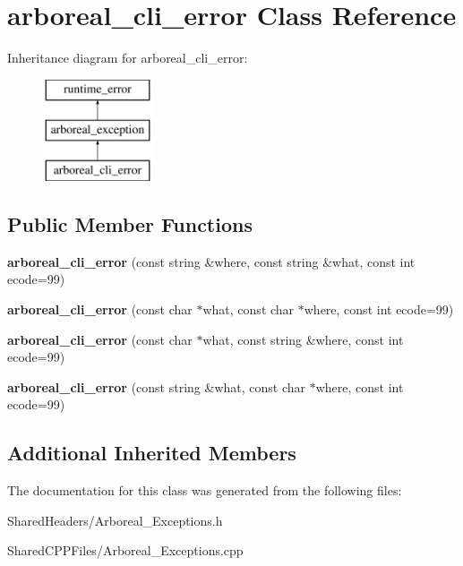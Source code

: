 \hypertarget{classarboreal__cli__error}{}\section{arboreal\+\_\+cli\+\_\+error Class Reference}
\label{classarboreal__cli__error}
Inheritance diagram for arboreal\+\_\+cli\+\_\+error\+:\begin{figure}[H]
\begin{center}
\leavevmode
\includegraphics[height=3.000000cm]{classarboreal__cli__error}
\end{center}
\end{figure}
\subsection*{Public Member Functions}
\begin{DoxyCompactItemize}
\item 
{\bfseries arboreal\+\_\+cli\+\_\+error} (const string \&where, const string \&what, const int ecode=99)\hypertarget{classarboreal__cli__error_a39291e6c997b531c712892b9623f938a}{}\label{classarboreal__cli__error_a39291e6c997b531c712892b9623f938a}

\item 
{\bfseries arboreal\+\_\+cli\+\_\+error} (const char $\ast$what, const char $\ast$where, const int ecode=99)\hypertarget{classarboreal__cli__error_adecf3ae0818fcdff4d375ef12ea1659e}{}\label{classarboreal__cli__error_adecf3ae0818fcdff4d375ef12ea1659e}

\item 
{\bfseries arboreal\+\_\+cli\+\_\+error} (const char $\ast$what, const string \&where, const int ecode=99)\hypertarget{classarboreal__cli__error_ab9388ea7e89c5232d7dd43d00019fef6}{}\label{classarboreal__cli__error_ab9388ea7e89c5232d7dd43d00019fef6}

\item 
{\bfseries arboreal\+\_\+cli\+\_\+error} (const string \&what, const char $\ast$where, const int ecode=99)\hypertarget{classarboreal__cli__error_a297adfc95de15ebdceae7cf364d05600}{}\label{classarboreal__cli__error_a297adfc95de15ebdceae7cf364d05600}

\end{DoxyCompactItemize}
\subsection*{Additional Inherited Members}


The documentation for this class was generated from the following files\+:\begin{DoxyCompactItemize}
\item 
Shared\+Headers/Arboreal\+\_\+\+Exceptions.\+h\item 
Shared\+C\+P\+P\+Files/Arboreal\+\_\+\+Exceptions.\+cpp\end{DoxyCompactItemize}
